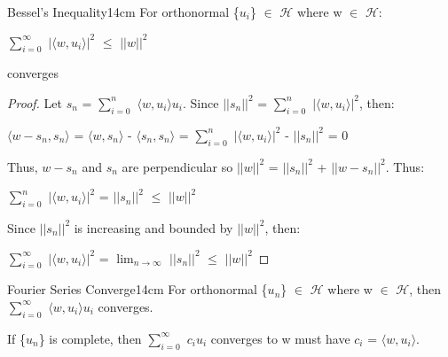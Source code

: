     \vspace{0.5cm}



    \begin{wtheorem}{Bessel's Inequality}{14cm}
        For orthonormal \{$u_i$\} $\in$ $\mathcal{H}$
        where w $\in$ $\mathcal{H}$:

        \hspace{0.5cm}
        $\sum_{i=0}^{\infty}$ $|\langle w , u_i \rangle|^2$
        $\leq$ $||w||^2$

        converges
    \end{wtheorem}

    \begin{proof}
        Let $s_n$ = $\sum_{i=0}^{n}$ $\langle w , u_i \rangle u_i$.
        Since $||s_n||^2$ = $\sum_{i=0}^{n}$ $|\langle w , u_i \rangle|^2$, then:

        \hspace{0.5cm}
        $\langle w-s_n , s_n \rangle$
        = $\langle w , s_n \rangle$ - $\langle s_n , s_n \rangle$
        = $\sum_{i=0}^{n}$ $|\langle w , u_i \rangle|^2$ - $||s_n||^2$
        = 0

        Thus, $w-s_n$ and $s_n$ are perpendicular so
        $||w||^2$ = $||s_n||^2$ + $||w-s_n||^2$. Thus:

        \hspace{0.5cm}
        $\sum_{i=0}^{n}$ $|\langle w , u_i \rangle|^2$
        = $||s_n||^2$ $\leq$ $||w||^2$

        Since $||s_n||^2$ is increasing and bounded by $||w||^2$, then:

        \hspace{0.5cm}
        $\sum_{i=0}^{\infty}$ $|\langle w , u_i \rangle|^2$
        = $\lim_{n \rightarrow \infty}$ $||s_n||^2$ $\leq$ $||w||^2$
    \end{proof}

    \vspace{0.5cm}



    \begin{wtheorem}{Fourier Series Converge}{14cm}
        For orthonormal \{$u_n$\} $\in$ $\mathcal{H}$ where w $\in$ $\mathcal{H}$,
        then $\sum_{i=0}^{\infty}$ $\langle w , u_i \rangle u_i$ converges.

        If \{$u_n$\} is complete, then
        $\sum_{i=0}^{\infty}$ $c_i u_i$ converges to w
        must have $c_i$ = $\langle w , u_i \rangle$.
    \end{wtheorem}

